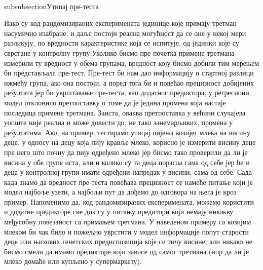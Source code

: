 \documentclass[12pt, a4paper]{article}
\begin{document}
\\subsubsection{Утицај пре-теста}

Иако су код рандомизираних експеримената јединице које примају третман насумично изабране, и даље 
постоји реална могућност да се оне у некој мери разликују, по вредности карактеристике која се 
испитује, од јединки које су сврстане у контролну групу.Уколико бисмо пре почетка примене третмана 
измерили ту вредност у обема групама, вредност коју бисмо добили тим мерењем би представљала 
пре-тест. Пре-тест би нам дао информацију о стартној разлици ижмеђу група, ако она постоји, а 
поред тога би и повећао прецизност добијених резултата јер би уврштавање пре-теста, као додатног 
предиктора, у регресиони модел отклонило претпоставку о томе да је једина промена која настаје 
последица примене третмана. Заиста, оваква претпоставка у већини случајева уопште није реална и 
може довести до, не тако занемарљивих, промена у резултатима. Ако, на пример, тестирамо утицај 
пијења козијег млека на висину деце, у односу на децу која пију кравље млеко, корисно је измерити 
висину деце пре него што почну да пију одређено млеко јер бисмо тако проверили да ли је висина у 
обе групе иста, али и колико су та деца порасла сама од себе јер ће и деца у контролној групи 
имати одређени напредак у висини, сама од себе. Сада када знамо да вредност пре-теста повећава 
прецизност се намеће питање који је модел најбоље узети, а најбољи пут да дођемо до одговора на 
њега је кроз пример. Напоменимо да, код рандомизираних експеримената, можемо користити и додатне 
предикторе све док су у питању предитори који немају никакву међусобну повезаност са примањем 
третмана. У наведеном примеру са козијим млеком би чак било и пожељно уврстити у модел информације 
попут старости деце или њихових генетских предиспозиција које се тичу висине, али никако не бисмо 
смели да имамо предикторе који зависе од самог третмана (нпр да ли је млеко домаће или купљено у 
супермаркету).
\end{document}
